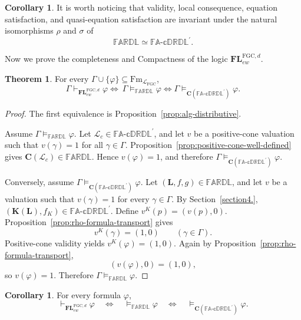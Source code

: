 \documentclass[final,12pt,times]{elsarticle}
\theoremstyle{plain}
\theoremstyle{definition}
\newtheorem{theorem}[definition]{Theorem}
\newtheorem{corollary}[definition]{Corollary}
\theoremstyle{break}
\newcommand{\FARDL}{\mathbb{FARDL}}
\newcommand{\CFADp}{\mathbb{FA\text{-}cDRDL}^{\prime}}
\newcommand{\Cfun}{\mathbf C}
\begin{document}
\begin{corollary}
\label{cor:equivalence-invariance}
It is worth noticing that validity, local consequence, equation satisfaction, and quasi-equation
satisfaction are invariant under the natural isomorphisms \(\rho\) and
\(\sigma\) of
\[
 \FARDL\simeq\CFADp.
\]
\end{corollary}

Now we prove the completeness and Compactness of the logic \(\mathbf{FL}^{\mathrm{FGC},d}_{ew}\).

\begin{theorem}
\label{thm:positive-cone-completeness}
For every \(\Gamma\cup\{\varphi\}\subseteq
\mathrm{Fm}_{\mathcal L_{\mathrm{FGC}}}\),
\[
 \Gamma\vdash_{\mathbf{FL}^{\mathrm{FGC},d}_{ew}}\varphi
 \Longleftrightarrow\
 \Gamma\models_{\FARDL}\varphi
 \Longleftrightarrow
 \Gamma\models_{\Cfun(\CFADp)}\varphi.
\]
\end{theorem}

\begin{proof}
The first equivalence is Proposition~\ref{prop:alg-distributive}.

Assume \(\Gamma\models_{\FARDL}\varphi\).  Let
\(\mathcal{\mathscr L}_c\in\CFADp\), and let \(v\) be a positive-cone
valuation such that \(v(\gamma)=1\) for all \(\gamma\in\Gamma\).
Proposition~\ref{prop:positive-cone-well-defined} gives
\(\Cfun(\mathcal{\mathscr L}_c)\in\FARDL\).  Hence \(v(\varphi)=1\), and
therefore
\(\Gamma\models_{\Cfun(\CFADp)}\varphi\).

Conversely, assume
\(\Gamma\models_{\Cfun(\CFADp)}\varphi\).  Let
\((\mathbf L,f,g)\in\FARDL\), and let \(v\) be a valuation such that
\(v(\gamma)=1\) for every \(\gamma\in\Gamma\).  By Section~\ref{section4.},
\((\mathbf K(\mathbf{L}),f_K)\in\CFADp\).  Define
\(v^K(p)=(v(p),0)\).  Proposition~\ref{prop:rho-formula-transport} gives
\[
 v^K(\gamma)=(1,0)
 \qquad(\gamma\in\Gamma).
\]
Positive-cone validity yields \(v^K(\varphi)=(1,0)\).  Again by
Proposition~\ref{prop:rho-formula-transport},
\[
 (v(\varphi),0)=(1,0),
\]
so \(v(\varphi)=1\).  Therefore
\(\Gamma\models_{\FARDL}\varphi\).
\end{proof}

\begin{corollary}
\label{cor:positive-global-completeness}
For every formula \(\varphi\),
\[
 \vdash_{\mathbf{FL}^{\mathrm{FGC},d}_{ew}}\varphi
 \quad\Longleftrightarrow\quad
 \models_{\FARDL}\varphi
 \quad\Longleftrightarrow\quad
 \models_{\Cfun(\CFADp)}\varphi.
\]
\end{corollary}
\end{document}
